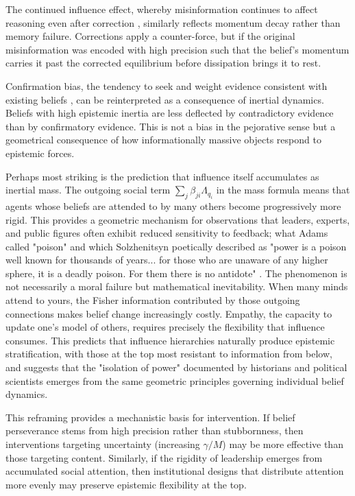 \documentclass[12pt]{article}
\begin{document}
The continued influence effect, whereby misinformation continues to affect reasoning even after correction \citep{Lewandowsky2012}, similarly reflects momentum decay rather than memory failure. Corrections apply a counter-force, but if the original misinformation was encoded with high precision such that the belief's momentum carries it past the corrected equilibrium before dissipation brings it to rest.

Confirmation bias, the tendency to seek and weight evidence consistent with existing beliefs \citep{nickerson1998}, can be reinterpreted as a consequence of inertial dynamics. Beliefs with high epistemic inertia are less deflected by contradictory evidence than by confirmatory evidence. This is not a bias in the pejorative sense but a geometrical consequence of how informationally massive objects respond to epistemic forces.

Perhaps most striking is the prediction that influence itself accumulates as inertial mass. The outgoing social term $\sum_j \beta_{ji}\Lambda_{q_i}$ in the mass formula means that agents whose beliefs are attended to by many others become progressively more rigid. This provides a geometric mechanism for observations that leaders, experts, and public figures often exhibit reduced sensitivity to feedback; what Adams called "poison" and which Solzhenitsyn poetically described as "power is a poison well known for thousands of years... for those who are unaware of any higher sphere, it is a deadly poison. For them there is no antidote" \citep{adams1918education, solzhenitsyn1973gulag}. The phenomenon is not necessarily a moral failure but mathematical inevitability. When many minds attend to yours, the Fisher information contributed by those outgoing connections makes belief change increasingly costly. Empathy, the capacity to update one's model of others, requires precisely the flexibility that influence consumes. This predicts that influence hierarchies naturally produce epistemic stratification, with those at the top most resistant to information from below, and suggests that the "isolation of power" documented by historians and political scientists emerges from the same geometric principles governing individual belief dynamics.

This reframing provides a mechanistic basis for intervention. If belief perseverance stems from high precision rather than stubbornness, then interventions targeting uncertainty (increasing $\gamma/M$) may be more effective than those targeting content. Similarly, if the rigidity of leadership emerges from accumulated social attention, then institutional designs that distribute attention more evenly may preserve epistemic flexibility at the top.
\end{document}
